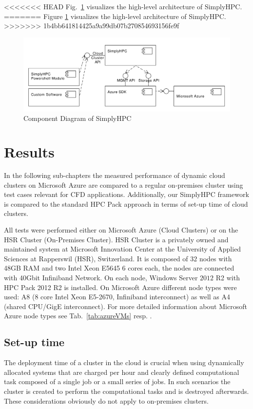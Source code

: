 \documentclass[3p,times]{elsarticle}
\begin{document}
<<<<<<< HEAD
Fig.~\ref{fig:simplyHPCArch} visualizes the high-level architecture of SimplyHPC.
=======
Figure \ref{fig:simplyHPCArch} visualizes the high-level architecture of SimplyHPC.
>>>>>>> 1b4bb641814425a9a99db07b270854693156fe9f

\begin{figure}[h]
\centering
	\includegraphics[width=.8\linewidth]{simplyHPCArch}
	\caption{Component Diagram of SimplyHPC}
	\label{fig:simplyHPCArch}
\end{figure}


\section{Results}
\label{sec:results}
In the following sub-chapters the measured performance of dynamic cloud clusters on Microsoft Azure are compared to a regular on-premises cluster using test cases relevant for CFD applications. Additionally, our SimplyHPC framework is compared to the standard HPC Pack approach in terms of set-up time of cloud clusters.

All tests were performed either on Microsoft Azure (Cloud Clusters) or on the HSR Cluster (On-Premises Cluster). HSR Cluster is a privately owned and maintained system at Microsoft Innovation Center at the University of Applied Sciences at Rapperswil (HSR), Switzerland. It is composed of $32$ nodes with 48GB RAM and two Intel Xeon E5645 6 cores each, the nodes are connected with 40Gbit Infiniband Network. On each node, Windows Server $2012$ R2 with HPC Pack 2012 R2 is installed.
On Microsoft Azure different node types were used: A8 (8 core Intel Xeon E5-2670, Infiniband interconnect) as well as A4 (shared CPU/GigE interconnect). For more detailed information about Microsoft Azure node types see Tab.~\ref{tab:azureVMs} resp. \cite{azure}.

\subsection{Set-up time}
The deployment time of a cluster in the cloud is crucial when using dynamically allocated systems that are charged per hour and clearly defined computational task composed of a single job or a small series of jobs. In such scenarios the cluster is created to perform the computational tasks and is destroyed afterwards. These considerations obviously do not apply to on-premises clusters.
\end{document}

